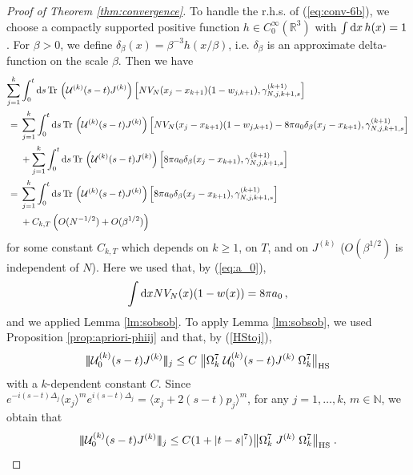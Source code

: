 \documentclass[11pt]{article}
\newcommand{\tri}{| \! | \! |}
\newcommand{\rd}{{\rm d}}
\newcommand{\la}{\langle}
\newcommand{\ra}{\rangle}
\newcommand{\cU}{{\cal U}}
\newcommand{\bR}{{\mathbb R}}
\newcommand{\bN}{{\mathbb N}}
\newcommand{\tr}{\mbox{Tr}}
\begin{document}
\begin{proof}[Proof of Theorem \ref{thm:convergence}]
To handle the r.h.s. of (\ref{eq:conv-6b}), we choose a compactly
supported positive function $h \in C_0^{\infty} (\bR^3)$ with $\int
\rd x \, h(x) =1$. For $\beta >0$, we define $\delta_{\beta} (x) =
\beta^{-3} h(x/\beta)$, i.e. $\delta_{\beta}$ is an approximate
delta-function on the scale $\beta$. Then we have
\begin{equation}\label{eq:conv-7}
\begin{split}
\sum_{j=1}^k &\int_0^t \rd s \, \tr \, \left(\cU^{(k)} (s-t)
J^{(k)}\right) \left[ N V_N (x_j -x_{k+1}) (1-w_{j,k+1}),
\gamma_{N,j,k+1,s}^{(k+1)} \right] \\ = \; &\sum_{j=1}^k \int_0^t
\rd s \, \tr \, \left(\cU^{(k)} (s-t) J^{(k)}\right) \left[ N V_N
(x_j -x_{k+1}) (1-w_{j,k+1}) - 8\pi a_0 \delta_{\beta} (x_j
-x_{k+1}), \gamma_{N,j,k+1,s}^{(k+1)} \right] \\ &+\sum_{j=1}^k
\int_0^t \rd s \, \tr \, \left(\cU^{(k)} (s-t) J^{(k)}\right) \left[
8\pi a_0 \delta_{\beta} (x_j -x_{k+1}), \gamma_{N,j,k+1,s}^{(k+1)}
\right]
\\ = \; & \sum_{j=1}^k
\int_0^t \rd s \, \tr \, \left(\cU^{(k)} (s-t) J^{(k)}\right) \left[
8\pi a_0 \delta_{\beta} (x_j -x_{k+1}), \gamma_{N,j,k+1,s}^{(k+1)}
\right] \\ &+C_{k,T} \left( O(N^{-1/2}) + O(\beta^{1/2}) \right)
\end{split}
\end{equation}
for some constant $C_{k,T}$ which depends on $k\geq 1$, on $T$, and
on $J^{(k)}$ ($O(\beta^{1/2})$ is independent of $N$). Here we used
that, by (\ref{eq:a_0}),
\begin{equation}
\int \rd x N V_N(x) (1-w(x)) = 8\pi a_0\,,
\end{equation}
and we applied Lemma \ref{lm:sobsob}.  To apply Lemma
\ref{lm:sobsob}, we used Proposition \ref{prop:apriori-phiij} and
that, by (\ref{HStoj}),
$$
 \tri \cU^{(k)}_0 (s-t) J^{(k)} \tri_j
\leq C \; \big\| \Omega_k^7 \; \cU^{(k)}_0 (s-t) J^{(k)} \;
\Omega_k^7 \big\|_{\text{HS}}
$$
with a $k$-dependent constant $C$. Since $e^{-i(s-t)\Delta_j} \la
x_j \ra^{m} e^{i(s-t) \Delta_j} = \la x_j +2 (s-t) p_j \ra^{m}$, for
any $j=1,\dots,k$, $m\in \bN$, we obtain that
$$
 \tri \cU^{(k)}_0 (s-t) J^{(k)} \tri_j
\leq C (1 + |t-s|^7)\big\| \Omega_k^7  \; J^{(k)} \;  \Omega_k^7
\big\|_{\text{HS}} \; .
$$

\medskip


\end{proof}
\end{document}
